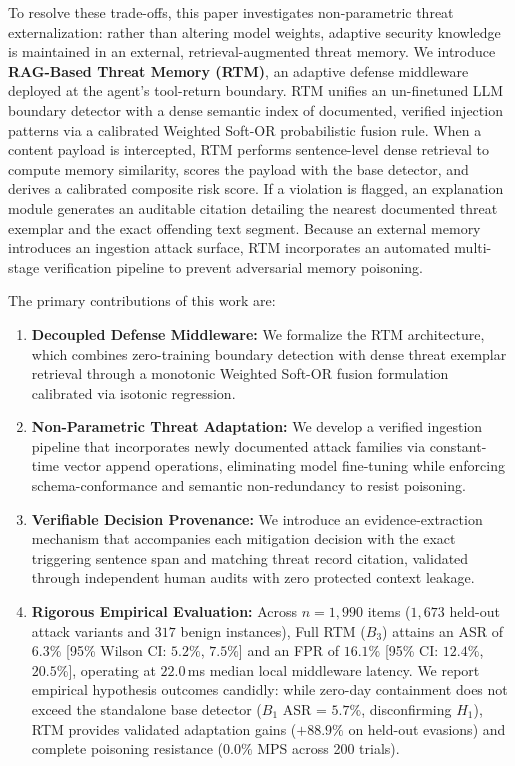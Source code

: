 \documentclass[conference]{IEEEtran}
\begin{document}
To resolve these trade-offs, this paper investigates non-parametric threat externalization: rather than altering model weights, adaptive security knowledge is maintained in an external, retrieval-augmented threat memory. We introduce \textbf{RAG-Based Threat Memory (RTM)}, an adaptive defense middleware deployed at the agent's tool-return boundary. RTM unifies an un-finetuned LLM boundary detector with a dense semantic index of documented, verified injection patterns via a calibrated Weighted Soft-OR probabilistic fusion rule. When a content payload is intercepted, RTM performs sentence-level dense retrieval to compute memory similarity, scores the payload with the base detector, and derives a calibrated composite risk score. If a violation is flagged, an explanation module generates an auditable citation detailing the nearest documented threat exemplar and the exact offending text segment. Because an external memory introduces an ingestion attack surface, RTM incorporates an automated multi-stage verification pipeline to prevent adversarial memory poisoning.

The primary contributions of this work are:
\begin{enumerate}
    \item \textbf{Decoupled Defense Middleware:} We formalize the RTM architecture, which combines zero-training boundary detection with dense threat exemplar retrieval through a monotonic Weighted Soft-OR fusion formulation calibrated via isotonic regression.
    \item \textbf{Non-Parametric Threat Adaptation:} We develop a verified ingestion pipeline that incorporates newly documented attack families via constant-time vector append operations, eliminating model fine-tuning while enforcing schema-conformance and semantic non-redundancy to resist poisoning.
    \item \textbf{Verifiable Decision Provenance:} We introduce an evidence-extraction mechanism that accompanies each mitigation decision with the exact triggering sentence span and matching threat record citation, validated through independent human audits with zero protected context leakage.
    \item \textbf{Rigorous Empirical Evaluation:} Across $n = 1,990$ items ($1,673$ held-out attack variants and $317$ benign instances), Full RTM ($B_3$) attains an ASR of $6.3\%$ [95\% Wilson CI: $5.2\%$, $7.5\%$] and an FPR of $16.1\%$ [95\% CI: $12.4\%$, $20.5\%$], operating at $22.0$\,ms median local middleware latency. We report empirical hypothesis outcomes candidly: while zero-day containment does not exceed the standalone base detector ($B_1$ ASR = $5.7\%$, disconfirming $H_1$), RTM provides validated adaptation gains ($+88.9\%$ on held-out evasions) and complete poisoning resistance ($0.0\%$ MPS across 200 trials).
\end{enumerate}
\end{document}
